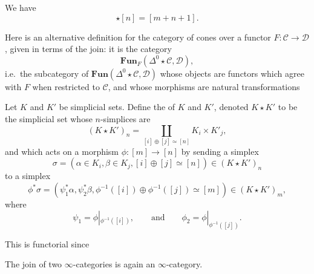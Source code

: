 \documentclass[main.tex]{subfiles}
\begin{document}
\begin{example}
  We have
  \begin{equation*}
    [m] \star [n] = [m + n + 1].
  \end{equation*}
\end{example}

\begin{example}
  Here is an alternative definition for the category of cones over a functor $F\colon \mathcal{C} \to \mathcal{D}$, given in terms of the join: it is the category
  \begin{equation*}
    \mathbf{Fun}_{F}(\Delta^{0} \star \mathcal{C}, \mathcal{D}),
  \end{equation*}
  i.e.\ the subcategory of $\mathbf{Fun}(\Delta^{0} \star \mathcal{C}, \mathcal{D})$ whose objects are functors which agree with $F$ when restricted to $\mathcal{C}$, and whose morphisms are natural transformations
\end{example}

\begin{definition}
  \label{def:join_of_simplicial_sets}
  Let $K$ and $K'$ be simplicial sets. Define the  of $K$ and $K'$, denoted $K \star K'$ to be the simplicial set whose $n$-simplices are
  \begin{equation*}
    (K \star K')_{n} = \coprod_{[i] \oplus [j] \simeq [n]} K_{i} \times K'_{j},
  \end{equation*}
  and which acts on a morphism $\phi\colon [m] \to [n]$ by sending a simplex
  \begin{equation*}
    \sigma = (\alpha \in K_{i}, \beta \in K_{j}, [i] \oplus [j] \simeq [n]) \in (K \star K')_{n}
  \end{equation*}
  to a simplex
  \begin{equation*}
    \phi^{*}\sigma = (\psi^{*}_{1} \alpha, \psi^{*}_{2} \beta, \phi^{-1}([i]) \oplus \phi^{-1}([j]) \simeq [m]) \in (K \star K')_{m},
  \end{equation*}
  where
  \begin{equation*}
    \psi_{1} = \phi|_{\phi^{-1}([i])},\qquad\text{and}\qquad \phi_{2} = \phi|_{\phi^{-1}([j])}.
  \end{equation*}

  This is functorial since
\end{definition}

\begin{proposition}
  The join of two $\infty$-categories is again an $\infty$-category.
\end{proposition}
\end{document}
